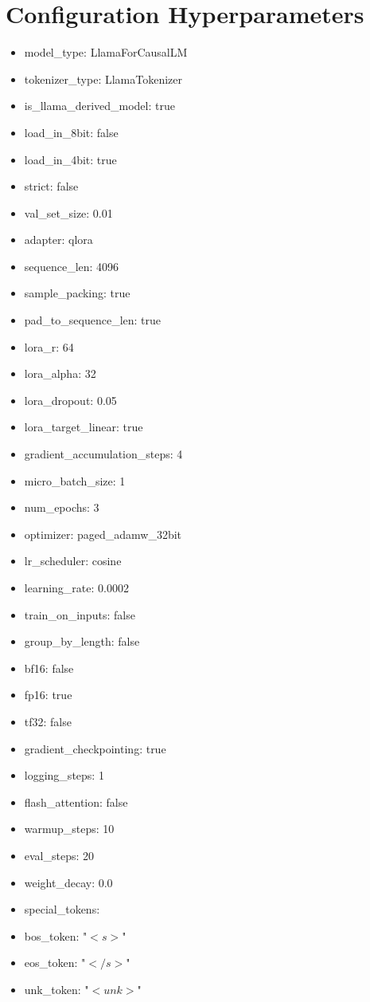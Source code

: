 \documentclass[letterpaper]{article} %
\begin{document}
\section{Configuration Hyperparameters}


\begin{itemize}
    \item model\_type: LlamaForCausalLM
    \item tokenizer\_type: LlamaTokenizer
    \item is\_llama\_derived\_model: true
    \item load\_in\_8bit: false
    \item load\_in\_4bit: true
    \item strict: false
    \item val\_set\_size: 0.01
    \item adapter: qlora
    \item sequence\_len: 4096
    \item sample\_packing: true
    \item pad\_to\_sequence\_len: true
    \item lora\_r: 64
    \item lora\_alpha: 32
    \item lora\_dropout: 0.05
    \item lora\_target\_linear: true
    \item gradient\_accumulation\_steps: 4
    \item micro\_batch\_size: 1
    \item num\_epochs: 3
    \item optimizer: paged\_adamw\_32bit
    \item  lr\_scheduler: cosine
    \item learning\_rate: 0.0002
    \item train\_on\_inputs: false
    \item group\_by\_length: false
    \item bf16: false
    \item fp16: true
    \item tf32: false
    \item gradient\_checkpointing: true
    \item logging\_steps: 1
    \item flash\_attention: false
    \item warmup\_steps: 10
    \item eval\_steps: 20
    \item weight\_decay: 0.0
    \item special\_tokens:
      \item bos\_token: "$<s>$"
      \item eos\_token: "$</s>$"
      \item unk\_token: "$<unk>$"
\end{itemize}
\end{document}
